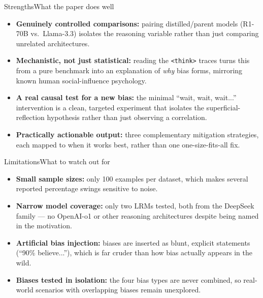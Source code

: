 \documentclass[10pt]{beamer}
\begin{document}
	\begin{frame}{Strengths}{What the paper does well}
	\begin{itemize}
		\item \textbf{Genuinely controlled comparisons:} pairing distilled/parent models (R1-70B vs.\ Llama-3.3) isolates the reasoning variable rather than just comparing unrelated architectures.
		\item \textbf{Mechanistic, not just statistical:} reading the \texttt{<think>} traces turns this from a pure benchmark into an explanation of \emph{why} bias forms, mirroring known human social-influence psychology.
		\item \textbf{A real causal test for a new bias:} the minimal ``wait, wait, wait...'' intervention is a clean, targeted experiment that isolates the superficial-reflection hypothesis rather than just observing a correlation.
		\item \textbf{Practically actionable output:} three complementary mitigation strategies, each mapped to when it works best, rather than one one-size-fits-all fix.
	\end{itemize}
	\end{frame}

	\begin{frame}{Limitations}{What to watch out for}
	\begin{itemize}
		\item \textbf{Small sample sizes:} only 100 examples per dataset, which makes several reported percentage swings sensitive to noise.
		\item \textbf{Narrow model coverage:} only two LRMs tested, both from the DeepSeek family — no OpenAI-o1 or other reasoning architectures despite being named in the motivation.
		\item \textbf{Artificial bias injection:} biases are inserted as blunt, explicit statements (``90\% believe...''), which is far cruder than how bias actually appears in the wild.
		\item \textbf{Biases tested in isolation:} the four bias types are never combined, so real-world scenarios with overlapping biases remain unexplored.
	\end{itemize}
	\end{frame}
\end{document}
